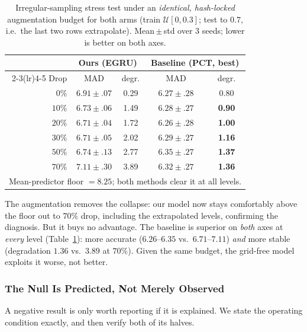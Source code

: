 \documentclass[10pt,journal]{IEEEtran}
\begin{document}
\begin{table}[!t]
\centering
\caption{Irregular-sampling stress test under an \emph{identical, hash-locked} augmentation budget
for both arms (train $\mathcal{U}[0,0.3]$; test to $0.7$, i.e.\ the last two rows extrapolate).
Mean\,$\pm$\,std over 3 seeds; lower is better on both axes.}
\label{tab:resampling}
\small
\begin{tabular}{rcccc}
\toprule
& \multicolumn{2}{c}{Ours (EGRU)} & \multicolumn{2}{c}{Baseline (PCT, best)} \\
\cmidrule(lr){2-3}\cmidrule(lr){4-5}
Drop & MAD & degr. & MAD & degr. \\
\midrule
$0\%$  & $6.91{\pm}.07$ & 0.29 & $\mathbf{6.27{\pm}.28}$ & 0.80 \\
$10\%$ & $6.73{\pm}.06$ & 1.49 & $\mathbf{6.28{\pm}.27}$ & \textbf{0.90} \\
$20\%$ & $6.71{\pm}.04$ & 1.72 & $\mathbf{6.26{\pm}.28}$ & \textbf{1.00} \\
$30\%$ & $6.71{\pm}.05$ & 2.02 & $\mathbf{6.29{\pm}.27}$ & \textbf{1.16} \\
$50\%$ & $6.74{\pm}.13$ & 2.77 & $\mathbf{6.35{\pm}.27}$ & \textbf{1.37} \\
$70\%$ & $7.11{\pm}.30$ & 3.89 & $\mathbf{6.32{\pm}.27}$ & \textbf{1.36} \\
\midrule
\multicolumn{5}{l}{\footnotesize Mean-predictor floor $=8.25$; both methods clear it at all levels.} \\
\bottomrule
\end{tabular}
\end{table}

The augmentation removes the collapse: our model now stays comfortably above the floor out to
$70\%$ drop, including the extrapolated levels, confirming the diagnosis. But it buys no advantage.
The baseline is superior on \emph{both} axes at \emph{every} level (Table~\ref{tab:resampling}):
more accurate ($6.26$--$6.35$ vs.\ $6.71$--$7.11$) \emph{and} more stable (degradation $1.36$ vs.\
$3.89$ at $70\%$). Given the same budget, the grid-free model exploits it worse, not better.

\subsubsection{The Null Is Predicted, Not Merely Observed}
\label{sec:results:bandwidth}

A negative result is only worth reporting if it is explained. We state the operating condition
exactly, and then verify both of its halves.
\end{document}
